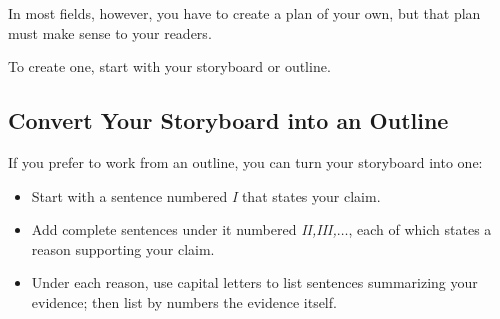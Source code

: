 \documentclass[oneside]{book}
\numberwithin{equation}{section}
\begin{document}
In most fields, however, you have to create a plan of your own, but that plan must make sense to your readers.

To create one, start with your storyboard or outline.

\subsection{Convert Your Storyboard into an Outline}
If you prefer to work from an outline, you can turn your storyboard into one:
\begin{itemize}
    \item Start with a sentence numbered \textit{I} that states your claim.
    \item Add complete sentences under it numbered \textit{II,III,$\ldots$}, each of which states a reason supporting your claim.
    \item Under each reason, use capital letters to list sentences summarizing your evidence; then list by numbers the evidence itself.
    

\end{itemize}
\end{document}
